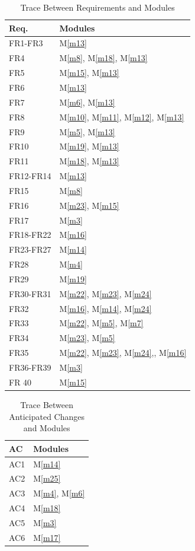 \documentclass[12pt]{article}
\newcommand{\mref}[1]{M\ref{#1}}
\begin{document}
\begin{table}[H]
\centering
\begin{tabular}{p{} p{}}
\toprule
\textbf{Req.} & \textbf{Modules}\\
\midrule
FR1-FR3 & \mref{m13}\\
FR4 & \mref{m8}, \mref{m18}, \mref{m13}\\
FR5 & \mref{m15}, \mref{m13}\\
FR6 & \mref{m13}\\
FR7 & \mref{m6}, \mref{m13}\\
FR8 & \mref{m10}, \mref{m11}, \mref{m12}, \mref{m13}\\
FR9 & \mref{m5}, \mref{m13}\\
FR10 & \mref{m19}, \mref{m13}\\
FR11 & \mref{m18}, \mref{m13}\\
FR12-FR14 & \mref{m13}\\
FR15 & \mref{m8}\\
FR16 & \mref{m23}, \mref{m15}\\
FR17 & \mref{m3}\\
FR18-FR22 & \mref{m16}\\
FR23-FR27 & \mref{m14}\\
FR28 & \mref{m4}\\
FR29 & \mref{m19}\\
FR30-FR31 & \mref{m22}, \mref{m23}, \mref{m24}\\
FR32 & \mref{m16}, \mref{m14}, \mref{m24}\\
FR33 & \mref{m22}, \mref{m5}, \mref{m7}\\
FR34 & \mref{m23}, \mref{m5}\\
FR35 & \mref{m22}, \mref{m23}, \mref{m24},, \mref{m16}\\
FR36-FR39 & \mref{m3}\\
FR 40 & \mref{m15}\\

\bottomrule
\end{tabular}
\caption{Trace Between Requirements and Modules}
\label{TblRT}
\end{table}

\begin{table}[H]
\centering
\begin{tabular}{p{} p{}}
\toprule
\textbf{AC} & \textbf{Modules}\\
\midrule
AC1 & \mref{m14}\\
AC2 & \mref{m25}\\
AC3 & \mref{m4}, \mref{m6}\\
AC4 & \mref{m18}\\
AC5 & \mref{m3}\\
AC6 & \mref{m17}\\
\bottomrule
\end{tabular}
\caption{Trace Between Anticipated Changes and Modules}
\label{TblACT}
\end{table}
\newpage
\end{document}
